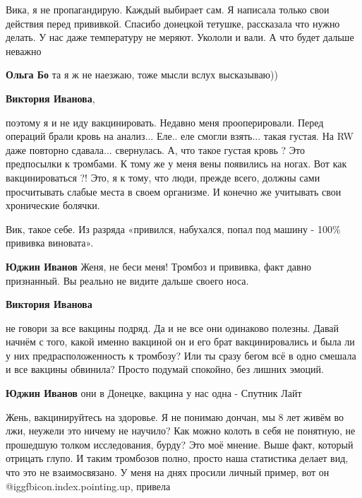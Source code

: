 \begin{itemize}
\begin{itemize}
Вика, я не пропагандирую. Каждый выбирает сам. Я написала только свои действия
перед прививкой. Спасибо донецкой тетушке, рассказала что нужно делать. У нас
даже температуру не меряют. Укололи и вали. А что будет дальше неважно

\textbf{Ольга Бо} та я ж не наезжаю, тоже мысли вслух высказываю))

\textbf{Виктория Иванова}, 

поэтому я и не иду вакцинировать. Недавно меня прооперировали. Перед операций
брали кровь на анализ... Еле.. еле смогли взять... такая густая. На RW даже
повторно сдавала... свернулась. А, что такое густая кровь ? Это предпосылки к
тромбами. К тому же у меня вены появились на ногах. Вот как вакцинироваться ?!
Это, я к тому, что люди, прежде всего, должны сами просчитывать слабые места в
своем организме. И конечно же учитывать свои хронические болячки.

\end{itemize} %


Вик, такое себе. Из разряда «привился, набухался, попал под машину - 100\%
прививка виновата».

\begin{itemize} %
\textbf{Юджин Иванов} Женя, не беси меня! Тромбоз и прививка, факт давно признанный. Вы реально не видите дальше своего носа.

\textbf{Виктория Иванова} 

не говори за все вакцины подряд. Да и не все они одинаково полезны. Давай
начнём с того, какой именно вакциной он и его брат вакцинировались и была ли у
них предрасположенность к тромбозу? Или ты сразу бегом всё в одно смешала и все
вакцины обвинила? Просто подумай спокойно, без лишних эмоций.

\textbf{Юджин Иванов} они в Донецке, вакцина у нас одна - Спутник Лайт


Жень, вакцинируйтесь на здоровье. Я не понимаю дончан, мы 8 лет живём во лжи,
неужели это ничему не научило? Как можно колоть в себя не понятную, не
прошедшую толком исследования, бурду? Это моё мнение. Выше факт, который
отрицать глупо. И таким тромбозов полно, просто наша статистика делает вид, что
это не взаимосвязано. У меня на днях просили личный пример, вот он
@igg{fbicon.index.pointing.up}, привела


\end{itemize}
\end{itemize}
